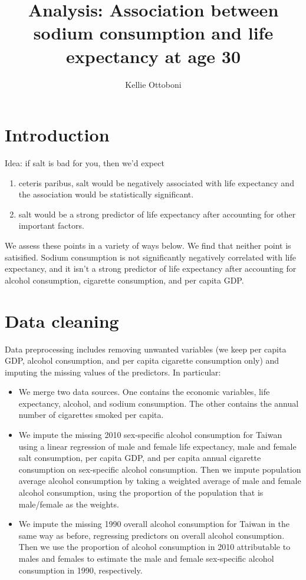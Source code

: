 \documentclass[11pt]{article}\usepackage[]{graphicx}\usepackage[]{color}
\title{Analysis: Association between sodium consumption and life expectancy at age 30}
\author{Kellie Ottoboni}
\begin{document}
\maketitle




\section{Introduction}
Idea: if salt is bad for you, then we'd expect 
\begin{enumerate}
\item ceteris paribus, salt would be negatively associated with life expectancy and the association would be statistically significant.
\item salt would be a strong predictor of life expectancy after accounting for other important factors.
\end{enumerate}
We assess these points in a variety of ways below.
We find that neither point is satisified.
Sodium consumption is not significantly negatively correlated with life expectancy, and it isn't a strong predictor of life expectancy after accounting for alcohol consumption, cigarette consumption, and per capita GDP.
\section{Data cleaning}

Data preprocessing includes removing unwanted variables (we keep per capita GDP, alcohol consumption, and per capita cigarette consumption only) and imputing the missing values of the predictors. In particular:

\begin{itemize}
\item We merge two data sources. One contains the economic variables, life expectancy, alcohol, and sodium consumption. The other contains the annual number of cigarettes smoked per capita.
\item We impute the missing 2010 sex-specific alcohol consumption for Taiwan using a linear regression of male and female life expectancy, male and female salt consumption, per capita GDP, and per capita annual cigarette consumption on sex-specific alcohol consumption. Then we impute population average alcohol consumption by taking a weighted average of male and female alcohol consumption, using the proportion of the population that is male/female as the weights.
\item We impute the missing 1990 overall alcohol consumption for Taiwan in the same way as before, regressing predictors on overall alcohol consumption. Then we use the proportion of alcohol consumption in 2010 attributable to males and females to estimate the male and female sex-specific alcohol consumption in 1990, respectively.
\end{itemize}
\end{document}
